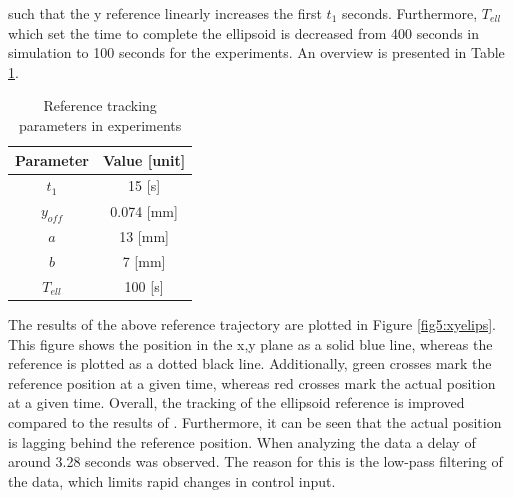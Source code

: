 such that the y reference linearly increases the first $t_1$ seconds. Furthermore, $T_{ell}$ which set the time to complete the ellipsoid is decreased from 400 seconds in simulation to 100 seconds for the experiments. An overview is presented in Table \ref{tab5:refparams}. 


\begin{table}[H]
    \centering
    \caption{Reference tracking parameters in experiments}
    \begin{tabular}{|c|c|} \hline
   \textbf{Parameter}  & \textbf{Value [unit]} \\ \hline
    $t_1$ &   15 [s]  \\ 
    $y_{off}$ & 0.074 [mm] \\
    $a$ & 13 [mm] \\
    $b$ & 7 [mm] \\
    $T_{ell}$ & 100 [s] \\ \hline
\end{tabular}
    \label{tab5:refparams}
\end{table}

The results of the above reference trajectory are plotted in Figure \ref{fig5:xyelips}. This figure shows the position in the x,y plane as a solid blue line, whereas the reference is plotted as a dotted black line. Additionally, green crosses mark the reference position at a given time, whereas red crosses mark the actual position at a given time. Overall, the tracking of the ellipsoid reference is improved compared to the results of \cite{berkers}. Furthermore, it can be seen that the actual position is lagging behind the reference position. When analyzing the data a delay of around 3.28 seconds was observed. The reason for this is the low-pass filtering of the data, which limits rapid changes in control input. 


